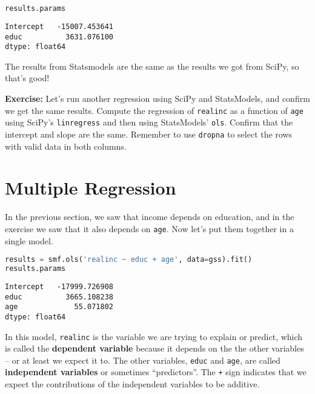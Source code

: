\begin{lstlisting}[language=Python,style=source]
results.params
\end{lstlisting}

\begin{lstlisting}[style=output]
Intercept   -15007.453641
educ          3631.076100
dtype: float64
\end{lstlisting}

The results from Statsmodels are the same as the results we got from
SciPy, so that's good!

\textbf{Exercise:} Let's run another regression using SciPy and
StatsModels, and confirm we get the same results. Compute the regression
of \passthrough{\lstinline!realinc!} as a function of
\passthrough{\lstinline!age!} using SciPy's
\passthrough{\lstinline!linregress!} and then using StatsModels'
\passthrough{\lstinline!ols!}. Confirm that the intercept and slope are
the same. Remember to use \passthrough{\lstinline!dropna!} to select the
rows with valid data in both columns.

\section{Multiple Regression}\label{multiple-regression}

In the previous section, we saw that income depends on education, and in
the exercise we saw that it also depends on
\passthrough{\lstinline!age!}. Now let's put them together in a single
model.

\begin{lstlisting}[language=Python,style=source]
results = smf.ols('realinc ~ educ + age', data=gss).fit()
results.params
\end{lstlisting}

\begin{lstlisting}[style=output]
Intercept   -17999.726908
educ          3665.108238
age             55.071802
dtype: float64
\end{lstlisting}

In this model, \passthrough{\lstinline!realinc!} is the variable we are
trying to explain or predict, which is called the \textbf{dependent
variable} because it depends on the the other variables -- or at least
we expect it to. The other variables, \passthrough{\lstinline!educ!} and
\passthrough{\lstinline!age!}, are called \textbf{independent variables}
or sometimes ``predictors''. The \passthrough{\lstinline!+!} sign
indicates that we expect the contributions of the independent variables
to be additive.


